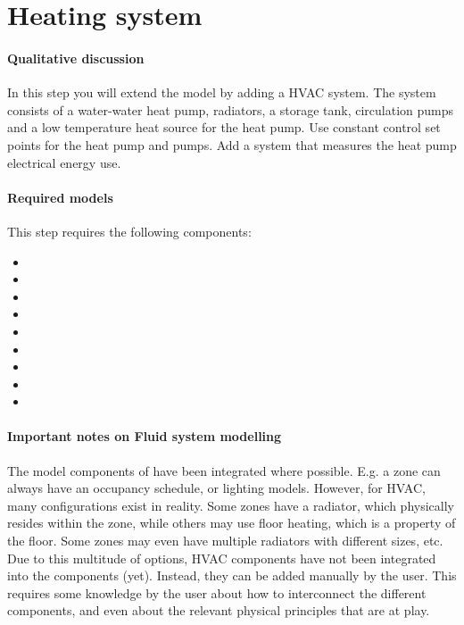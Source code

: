 \documentclass[10pt,a4paper]{article}
\begin{document}
\newpage

\section{Heating system}
\paragraph{Qualitative discussion}
In this step you will extend the model  
by adding a HVAC system.
The system consists of a water-water heat pump, radiators, 
a storage tank,
circulation pumps and a low temperature heat source for the heat pump.
Use constant control set points for the heat pump and pumps.
Add a system that measures the heat pump electrical energy use.

\paragraph{Required models}
This step requires the following components:
\begin{itemize}
\item {}
\item {}
\item {}
\item {}
\item {}
\item {}
\item {}
\item {}
\item {}
\end{itemize}

\paragraph{Important notes on Fluid system modelling}
The model components of  have been integrated where possible.
E.g. a zone can always have an occupancy schedule, or lighting models. 
However, for HVAC, many configurations exist in reality. 
Some zones have a radiator, which physically resides within the zone, 
while others may use floor heating, which is a property of the floor.
Some zones may even have multiple radiators with different sizes, etc.
Due to this multitude of options, HVAC components have not been integrated into
the  components (yet).
Instead, they can be added manually by the user.
This requires some knowledge by the user about how to interconnect the different components, 
and even about the relevant physical principles that are at play. \\
\end{document}
